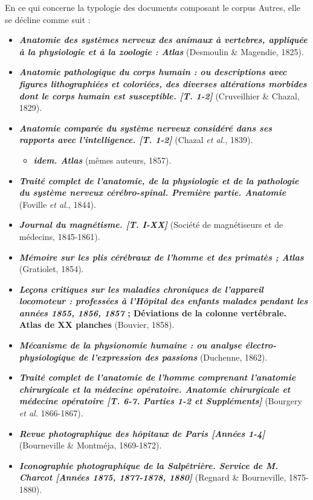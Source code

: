 En ce qui concerne la typologie des documents composant le corpus Autres, elle se décline comme suit :
\begin{itemize}
	\item \textbf{\textit{Anatomie des systèmes nerveux des animaux à vertebres, appliquée à la physiologie et à la zoologie : Atlas}} (Desmoulin \& Magendie, 1825).
	\item \textbf{\textit{Anatomie pathologique du corps humain : ou descriptions avec figures lithographiées et coloriées, des diverses altérations morbides dont le corps humain est susceptible. [T. 1-2]}} (Cruveilhier \& Chazal, 1829).
	\item \textbf{\textit{Anatomie comparée du système nerveux considéré dans ses rapports avec l'intelligence. [T. 1-2]}} (Chazal \textit{et al.}, 1839).
	\begin{itemize}
		\item \textit{\textbf{idem. Atlas}} (mêmes auteurs, 1857).
	\end{itemize}
	\item \textbf{\textit{Traité complet de l'anatomie, de la physiologie et de la pathologie du système nerveux cérébro-spinal. Première partie. Anatomie}} (Foville \textit{et al.}, 1844).
	\item \textbf{\textit{Journal du magnétisme. [T. I-XX]}} (Société de magnétiseurs et de médecins, 1845-1861).
	\item \textbf{\textit{Mémoire sur les plis cérébraux de l'homme et des primatès ; Atlas}} (Gratiolet, 1854).
	\item \textbf{\textit{Leçons critiques sur les maladies chroniques de l'appareil locomoteur : professées à l'Hôpital des enfants malades pendant les années 1855, 1856, 1857} ; Déviations de la colonne vertébrale. Atlas de XX planches} (Bouvier, 1858).
	\item \textbf{\textit{Mécanisme de la physionomie humaine : ou analyse électro-physiologique de l'expression des passions}} (Duchenne, 1862).
	\item \textbf{\textit{Traité complet de l'anatomie de l'homme comprenant l'anatomie chirurgicale et la médecine opératoire. Anatomie chirurgicale et médecine opératoire [T. 6-7. Parties 1-2 et Suppléments]}} (Bourgery \textit{et al.} 1866-1867).
	\item \textbf{\textit{Revue photographique des hôpitaux de Paris [Années 1-4]}} (Bourneville \& Montméja, 1869-1872).
	\item \textbf{\textit{Iconographie photographique de la Salpêtrière. Service de M. Charcot [Années 1875, 1877-1878, 1880]}} (Regnard \& Bourneville, 1875-1880).

\end{itemize}
